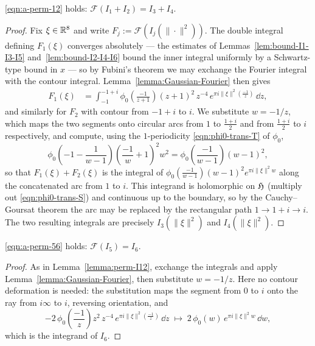 \begin{lemma}\label{lemma:perm-I12}\leanok
\eqref{eqn:a-perm-12} holds: $\mathcal{F}(I_1 + I_2) = I_3 + I_4$.
\end{lemma}
\begin{proof}
Fix $\xi \in \mathbb{R}^8$ and write $F_j := \mathcal{F}(I_j(\|\cdot\|^2))$. The double integral defining $F_1(\xi)$ converges absolutely --- the estimates of Lemmas~\ref{lem:bound-I1-I3-I5} and~\ref{lem:bound-I2-I4-I6} bound the inner integral uniformly by a Schwartz-type bound in $x$ --- so by Fubini's theorem we may exchange the Fourier integral with the contour integral. Lemma~\ref{lemma:Gaussian-Fourier} then gives
\begin{align}
    F_1(\xi) &= \int_{-1}^{-1+i} \phi_0\left(\frac{-1}{z+1}\right) (z+1)^2\, z^{-4}\, e^{\pi i \|\xi\|^2 (\frac{-1}{z})}\, \dd z,
\end{align}
and similarly for $F_2$ with contour from $-1 + i$ to $i$. We substitute $w = -1/z$, which maps the two segments onto circular arcs from $1$ to $\frac{1+i}{2}$ and from $\frac{1+i}{2}$ to $i$ respectively, and compute, using the $1$-periodicity \eqref{eqn:phi0-trans-T} of $\phi_0$,
\[
    \phi_0\left(-1-\frac{1}{w-1}\right)\left(\frac{-1}{w}+1\right)^2 w^2 = \phi_0\left(\frac{-1}{w-1}\right)(w-1)^2,
\]
so that $F_1(\xi) + F_2(\xi)$ is the integral of $\phi_0\left(\frac{-1}{w-1}\right)(w-1)^2 e^{\pi i \|\xi\|^2 w}$ along the concatenated arc from $1$ to $i$. This integrand is holomorphic on $\mathfrak{H}$ (multiply out \eqref{eqn:phi0-trans-S}) and continuous up to the boundary, so by the Cauchy--Goursat theorem the arc may be replaced by the rectangular path $1 \to 1 + i \to i$. The two resulting integrals are precisely $I_3(\|\xi\|^2)$ and $I_4(\|\xi\|^2)$.
\end{proof}

\begin{lemma}\label{lemma:perm-I56}\leanok
\eqref{eqn:a-perm-56} holds: $\mathcal{F}(I_5) = I_6$.
\end{lemma}
\begin{proof}
As in Lemma~\ref{lemma:perm-I12}, exchange the integrals and apply Lemma~\ref{lemma:Gaussian-Fourier}, then substitute $w = -1/z$. Here no contour deformation is needed: the substitution maps the segment from $0$ to $i$ onto the ray from $i\infty$ to $i$, reversing orientation, and
\[
    -2\,\phi_0\left(\frac{-1}{z}\right) z^2\, z^{-4}\, e^{\pi i \|\xi\|^2(\frac{-1}{z})}\,\dd z \;\longmapsto\; 2\,\phi_0(w)\, e^{\pi i \|\xi\|^2 w}\,\dd w,
\]
which is the integrand of $I_6$.
\end{proof}

